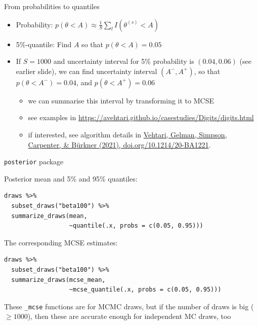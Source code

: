 \documentclass[english,t]{beamer}
\begin{document}
\begin{frame}{From probabilities to quantiles}

  \begin{itemize}
  \item Probability: $p(\theta < A)\approx \frac{1}{S}\sum_l I(\theta^{(s)} < A)$
  \item 5\%-quantile: Find $A$ so that $p(\theta < A)=0.05$
  \item<2-> If $S=1000$ and uncertainty interval for 5\% probability
    is $(0.04,0.06)$ (see earlier slide), we can find uncertainty
    interval $(A^-,A^+)$, so that $p(\theta < A^-)=0.04$, and
    $p(\theta < A^+)=0.06$
    \begin{itemize}
    \item<3-> we can summarise this interval by transforming it to MCSE
    \item<3-> see examples in \url{https://avehtari.github.io/casestudies/Digits/digits.html}
    \item<3-> {\color{gray}if interested, see algorithm details in \href{https://doi.org/10.1214/20-BA1221}{Vehtari, Gelman, Simpson, Carpenter, \& Bürkner (2021), doi.org/10.1214/20-BA1221}.}
    \end{itemize}
  \end{itemize}
  
\end{frame}

\begin{frame}[fragile]{\texttt{posterior} package}

  Posterior mean and 5\% and 95\% quantiles:
\vspace{-.5\baselineskip}
  {\small
\begin{verbatim}
draws %>%
  subset_draws("beta100") %>%
  summarize_draws(mean,
                  ~quantile(.x, probs = c(0.05, 0.95)))
\end{verbatim}
    }

\pause
The corresponding MCSE estimates:
\vspace{-.5\baselineskip}
  {\small
\begin{verbatim}
draws %>%
  subset_draws("beta100") %>%
  summarize_draws(mcse_mean,
                  ~mcse_quantile(.x, probs = c(0.05, 0.95)))
\end{verbatim}
  }

  \pause
  These \texttt{\_mcse} functions are for MCMC draws, but if
  the number of draws is big ($\geq 1000$), then these are accurate
  enough for independent MC draws, too
  
\end{frame}
\end{document}
